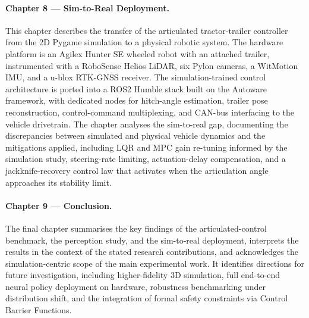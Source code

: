 \paragraph{Chapter 8 — Sim-to-Real Deployment.}
This chapter describes the transfer of the articulated tractor-trailer controller from the 2D Pygame simulation to a physical robotic system. The hardware platform is an Agilex Hunter SE wheeled robot with an attached trailer, instrumented with a RoboSense Helios LiDAR, six Pylon cameras, a WitMotion IMU, and a u-blox RTK-GNSS receiver. The simulation-trained control architecture is ported into a ROS2 Humble stack built on the Autoware framework, with dedicated nodes for hitch-angle estimation, trailer pose reconstruction, control-command multiplexing, and CAN-bus interfacing to the vehicle drivetrain. The chapter analyses the sim-to-real gap, documenting the discrepancies between simulated and physical vehicle dynamics and the mitigations applied, including LQR and MPC gain re-tuning informed by the simulation study, steering-rate limiting, actuation-delay compensation, and a jackknife-recovery control law that activates when the articulation angle approaches its stability limit.

\paragraph{Chapter 9 — Conclusion.}
The final chapter summarises the key findings of the articulated-control benchmark, the perception study, and the sim-to-real deployment, interprets the results in the context of the stated research contributions, and acknowledges the simulation-centric scope of the main experimental work. It identifies directions for future investigation, including higher-fidelity 3D simulation, full end-to-end neural policy deployment on hardware, robustness benchmarking under distribution shift, and the integration of formal safety constraints via Control Barrier Functions.
